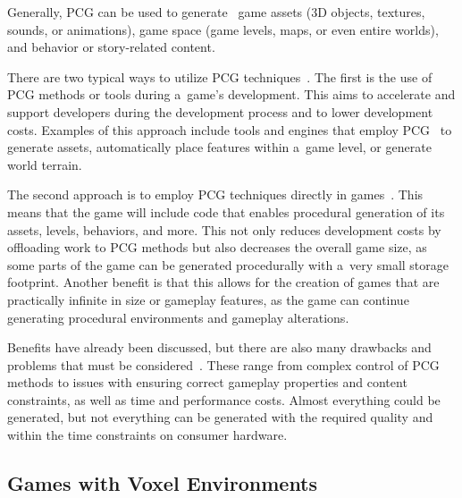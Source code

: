Generally, PCG can be used to generate~\cite{proc-cont-gen-games-survey-hendrikx, proc_gen_review, procdural_generation_game_design_book} game assets (3D objects, textures, sounds, or animations), game space (game levels, maps, or even entire worlds), and behavior or story-related content. 

There are two typical ways to utilize PCG techniques~\cite{procdural_generation_game_design_book, proc_gen_survey_mdpi}. The first is the use of PCG methods or tools during a~game's development. This aims to accelerate and support developers during the development process and to lower development costs. Examples of this approach include tools and engines that employ PCG~\cite{proc_gen_survey_mdpi} to generate assets, automatically place features within a~game level, or generate world terrain.

The second approach is to employ PCG techniques directly in games~\cite {proc_gen_survey_mdpi, procdural_generation_game_design_book, lagae-proc-noise-survey}. This means that the game will include code that enables procedural generation of its assets, levels, behaviors, and more. This not only reduces development costs by offloading work to PCG methods but also decreases the overall game size, as some parts of the game can be generated procedurally with a~very small storage footprint. Another benefit is that this allows for the creation of games that are practically infinite in size or gameplay features, as the game can continue generating procedural environments and gameplay alterations.

Benefits have already been discussed, but there are also many drawbacks and problems that must be considered~\cite{procdural_generation_game_design_book}. These range from complex control of PCG methods to issues with ensuring correct gameplay properties and content constraints, as well as time and performance costs. Almost everything could be generated, but not everything can be generated with the required quality and within the time constraints on consumer hardware.


\subsection{Games with Voxel Environments}

